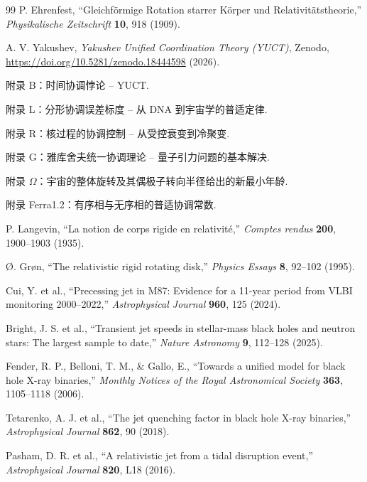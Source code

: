 \documentclass[12pt,a4paper]{article}
\begin{document}
	\begin{thebibliography}{99}
		P. Ehrenfest, ``Gleichf{\"o}rmige Rotation starrer K{\"o}rper und Relativit{\"a}tstheorie,'' \emph{Physikalische Zeitschrift} \textbf{10}, 918 (1909).
		
		A. V. Yakushev, \emph{Yakushev Unified Coordination Theory (YUCT)}, Zenodo, \url{https://doi.org/10.5281/zenodo.18444598} (2026).
		
		附录 B：时间协调悖论 -- YUCT.
		
		附录 L：分形协调误差标度 -- 从 DNA 到宇宙学的普适定律.
		
		附录 R：核过程的协调控制 -- 从受控衰变到冷聚变.
		
		附录 G：雅库舍夫统一协调理论 -- 量子引力问题的基本解决.
		
		附录 \(\Omega\)：宇宙的整体旋转及其偶极子转向半径给出的新最小年龄.
		
		附录 Ferra1.2：有序相与无序相的普适协调常数.
		
		P. Langevin, ``La notion de corps rigide en relativit{\'e},'' \emph{Comptes rendus} \textbf{200}, 1900--1903 (1935).
		
		{\O}. Gr{\o}n, ``The relativistic rigid rotating disk,'' \emph{Physics Essays} \textbf{8}, 92--102 (1995).
		
		Cui, Y. et al., ``Precessing jet in M87: Evidence for a 11-year period from VLBI monitoring 2000–2022,'' \emph{Astrophysical Journal} \textbf{960}, 125 (2024).
		
		Bright, J. S. et al., ``Transient jet speeds in stellar-mass black holes and neutron stars: The largest sample to date,'' \emph{Nature Astronomy} \textbf{9}, 112–128 (2025).
		
		Fender, R. P., Belloni, T. M., \& Gallo, E., ``Towards a unified model for black hole X-ray binaries,'' \emph{Monthly Notices of the Royal Astronomical Society} \textbf{363}, 1105–1118 (2006).
		
		Tetarenko, A. J. et al., ``The jet quenching factor in black hole X-ray binaries,'' \emph{Astrophysical Journal} \textbf{862}, 90 (2018).
		
		Pasham, D. R. et al., ``A relativistic jet from a tidal disruption event,'' \emph{Astrophysical Journal} \textbf{820}, L18 (2016).
		

\end{thebibliography}
\end{document}
